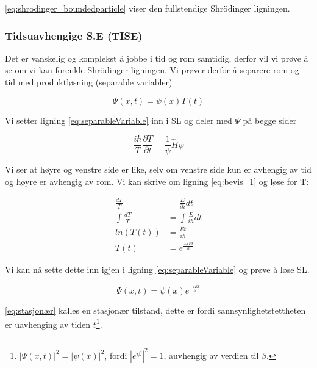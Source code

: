 \autoref{eq:shrodinger_boundedparticle} viser den fullstendige Shrödinger ligningen.

\subsubsection{Tidsuavhengige S.E (TISE)}
Det er vanskelig og komplekst å jobbe i tid og rom samtidig, derfor vil vi prøve å se om vi kan forenkle Shrödinger ligningen. Vi prøver derfor å separere rom og tid med produktløsning (separable variabler)

\begin{equation}
    \label{eq:separableVariable}
    \Psi(x,t) = \psi(x)T(t)
\end{equation}

Vi setter ligning \ref{eq:separableVariable} inn i SL og deler med $\Psi$ på begge sider

\begin{equation}
    \label{eq:bevis_1}
    \frac{i\hbar}{T}\frac{\partial T}{\partial t} = \frac{1}{\psi} \hat{H}\psi
\end{equation}

Vi ser at høyre og venstre side er like, selv om venstre side kun er avhengig av tid og høyre er avhengig av rom. Vi kan skrive om ligning \ref{eq:bevis_1} og løse for T:

\begin{equation}
    \label{eq:T(t)}
    \begin{split}
        \frac{dT}{T} &= \frac{E}{i\hbar}dt \\
        \int\frac{dT}{T} &= \int\frac{E}{i\hbar}dt\\
        ln(T(t)) &= \frac{Et}{i\hbar} \\
        T(t) &= e^{\frac{-iEt}{\hbar}}
    \end{split}
\end{equation}

Vi kan nå sette dette inn igjen i ligning \ref{eq:separableVariable} og prøve å løse SL.

\begin{equation}
    \label{eq:stasjonær}
    \Psi(x,t) = \psi(x)e^{\frac{-iEt}{\hbar}}
\end{equation}

\autoref{eq:stasjonær} kalles en stasjonær tilstand, dette er fordi sannsynlighetstettheten er uavhenging av tiden $t$\footnote{$|\Psi(x,t)|^2 = |\psi(x)|^2$, fordi $|e^{i\beta}|^2 = 1$, auvhengig av verdien til $\beta$.}.

